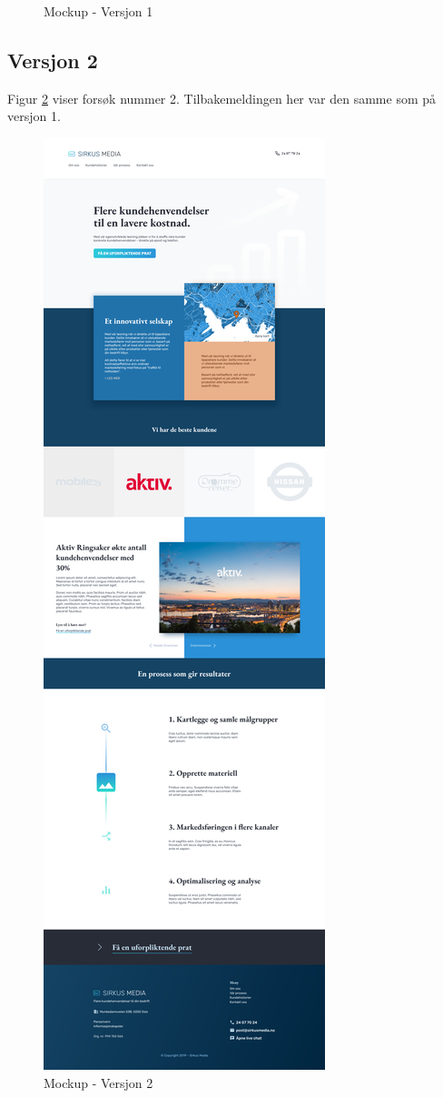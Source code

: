 \begin{figure}[H]
    \caption{Mockup - Versjon 1}
    \label{fig:mockup-v1}
\end{figure}

\subsection{Versjon 2}
Figur \ref{fig:mockup-v2} viser forsøk nummer 2. Tilbakemeldingen her var den samme som på versjon 1.
\begin{figure}[H]
    \centering
    \includegraphics[height=.85\textheight]{mockup2-draft3.png}
    \caption{Mockup - Versjon 2}
    \label{fig:mockup-v2}
\end{figure}


